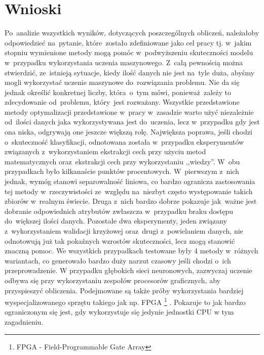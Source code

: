 
\section{Wnioski}\label{conclusion}
Po~analizie wszystkich wyników, dotyczących poszczególnych obliczeń, należałoby odpowiedzieć na~pytanie, które~zostało zdefiniowane jako cel pracy tj. w~jakim stopniu wymienione metody mogą pomóc w~podwyższeniu skuteczności modelu w~przypadku wykorzystania uczenia maszynowego. Z~całą pewnością można stwierdzić, ze~istnieją  sytuacje, kiedy ilość danych nie jest na~tyle duża, abyśmy mogli wykorzystać uczenie maszynowe do~rozwiązania problemu. Nie da się jednak określić konkretnej liczby, która~o~tym mówi, ponieważ~zależy to zdecydowanie od~problemu, który~jest rozważany. Wszystkie przedstawione metody optymalizacji przedstawione w~pracy w~zasadzie warto użyć niezależnie od~ilości danych jaka wykorzystywana jest do~uczenia, lecz w~przypadku gdy jest ona niska, odgrywają one jeszcze większą rolę. Największa poprawa, jeśli chodzi o~skuteczność klasyfikacji, odnotowana została w~przypadku eksperymentów związanych z~wykorzystaniem ekstrakcji cech przy użyciu metod matematycznych oraz~ekstrakcji cech przy wykorzystaniu ,,wiedzy''. W~obu przypadkach było kilkanaście punktów procentowych. W~pierwszym z~nich jednak, wymóg stanowi separowalność liniowa, co bardzo ogranicza zastosowania tej metody w~rzeczywistości ze~względu na~niezbyt często występowanie takich zbiorów w~realnym świecie. Druga z~nich bardzo dobrze pokazuje jak~ważne jest dobranie odpowiednich atrybutów zwłaszcza w~przypadku braku dostępu do~większej ilości danych. Pozostałe dwa eksperymenty, jeden związany z~wykorzystaniem walidacji krzyżowej oraz~drugi z~powielaniem danych, nie odnotowują już tak pokaźnych wzrostów skuteczności, lecz mogą stanowić znaczną pomoc. We wszystkich przypadkach testowane były 4 metody w~różnych wariantach, co generowało bardzo duży narzut czasowy jeśli chodzi o~ich przeprowadzenie. W przypadku głębokich sieci neuronowych, zazwyczaj uczenie odbywa się przy wykorzystaniu zespołów procesorów graficznych, aby przyspieszyć obliczenia. Podejmowane są także próby wykorzystania bardziej wyspecjalizowanego sprzętu takiego jak np. FPGA \footnote{FPGA - Field-Programmable Gate Array} \cite{nurvitadhi2017can}. Pokazuje to jak bardzo ograniczonym się jest, gdy wykorzystuje się jedynie jednostki CPU w tym zagadnieniu.

